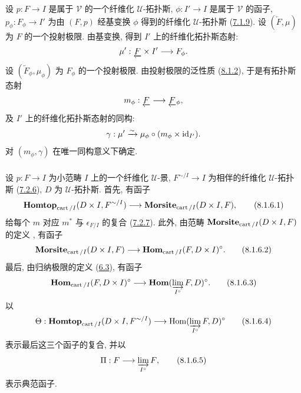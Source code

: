 设 $p : F \to I$ 是属于 $𝒱$ 的一个纤维化 $𝒰$-拓扑斯,
$\phi : I'\to I$ 是属于 $𝒱$ 的函子,
$p_{\phi} : F_{\phi} \to I'$
为由 $(F, p)$ 经基变换 $\phi$ 得到的纤维化 $𝒰$-拓扑斯
(\hyperref[VI.subsubsec7.1.9]{7.1.9}).
设 $(\underleftarrow{F}, \mu)$ 为 $F$ 的一个投射极限.
由基变换, 得到 $I'$ 上的纤维化拓扑斯态射:
$$
\mu' : \underleftarrow{F} \times I' \to F_{\phi}{\quoi}.
$$
设 $(\underleftarrow{F}_{\phi}, \mu_{\phi})$
为 $F_{\phi}$ 的一个投射极限.
由投射极限的泛性质
(\hyperref[VI.subsubsec8.1.2]{8.1.2}),
于是有拓扑斯态射
$$
m_{\phi} : \underleftarrow{F} \to \underleftarrow{F}_{\phi}{\quoi},
$$
及 $I'$ 上的纤维化拓扑斯态射的同构:
$$
\gamma : \mu'\xrightarrow{\sim} \mu_{\phi} \circ (m_{\phi} \times \operatorname{id}_{I'}){}.
$$
对 $(m_{\phi}, \gamma)$ 在唯一同构意义下确定.

\subsubsection{}

设 $p : F \to I$ 为小范畴 $I$ 上的一个纤维化 $𝒰$-景,
$F^{\sim/I} \to I$ 为相伴的纤维化 $𝒰$-拓扑斯
(\hyperref[VI.subsubsec7.2.6]{7.2.6}),
$D$ 为 $𝒰$-拓扑斯.
首先, 有函子
\begin{equation*}
\Hhomtop_{\cart / I} (D \times I, F^{\sim/I}) \to
\Mmorsite_{\cart/I}(D \times I, F){\quoi},\tag{8.1.6.1}
\end{equation*}
给每个 $m$ 对应 $m^{\ast}$ 与 $\epsilon_{F /I}$ 的复合
(\hyperref[VI.prop7.2.7]{7.2.7}).
此外, 由范畴 $\operatorname{\mathbf{Morsite}}_{\operatorname{cart} /I} (D \times I, F)$ 的定义
, 有函子
\begin{equation*}
\Mmorsite_{\cart/I}(D \times I, F) \to \Hhom_{\cart / I} (F, D \times
I)^{\circ}{\quoi}.\tag{8.1.6.2}
\end{equation*}
最后\pageoriginale{}, 由归纳极限的定义
(\hyperref[VI.def6.3]{6.3}), 有函子
\begin{equation*}
\Hhom_{\cart / I} (F, D \times I)^{\circ} \to
\Hhom(\varinjlim_{I^{\circ}}F, D)^{\circ}{\quoi}.\tag{8.1.6.3}
\end{equation*}
以
\begin{equation*}
\Theta : \Hhomtop_{\cart / I}(D \times I, F^{\sim / I}) \to
\Hom(\varinjlim_{I^{\circ}}F, D)^{\circ}\tag{8.1.6.4}
\end{equation*}
表示最后这三个函子的复合,
并以
\begin{equation*}
\Pi : F \to \varinjlim_{I^{\circ}}F{\quoi},\tag{8.1.6.5}
\end{equation*}
表示典范函子.

